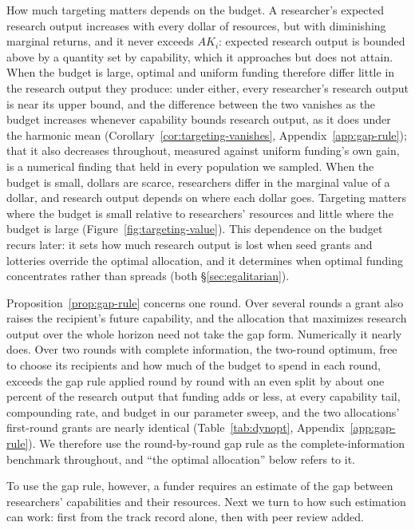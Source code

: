 \documentclass[article, 11pt, reqno]{amsart}
\theoremstyle{named}
\begin{document}
How much targeting matters depends on the budget. A researcher's expected research output increases with every dollar of resources, but with diminishing marginal returns, and it never exceeds $AK_i$: expected research output is bounded above by a quantity set by capability, which it approaches but does not attain. When the budget is large, optimal and uniform funding therefore differ little in the research output they produce: under either, every researcher's research output is near its upper bound, and the difference between the two vanishes as the budget increases whenever capability bounds research output, as it does under the harmonic mean (Corollary~\ref{cor:targeting-vanishes}, Appendix~\ref{app:gap-rule}); that it also decreases throughout, measured against uniform funding's own gain, is a numerical finding that held in every population we sampled. When the budget is small, dollars are scarce, researchers differ in the marginal value of a dollar, and research output depends on where each dollar goes. Targeting matters where the budget is small relative to researchers' resources and little where the budget is large (Figure~\ref{fig:targeting-value}). This dependence on the budget recurs later: it sets how much research output is lost when seed grants and lotteries override the optimal allocation, and it determines when optimal funding concentrates rather than spreads (both \S\ref{sec:egalitarian}).



Proposition~\ref{prop:gap-rule} concerns one round. Over several rounds a grant also raises the recipient's future capability, and the allocation that maximizes research output over the whole horizon need not take the gap form. Numerically it nearly does. Over two rounds with complete information, the two-round optimum, free to choose its recipients and how much of the budget to spend in each round, exceeds the gap rule applied round by round with an even split by about one percent of the research output that funding adds or less, at every capability tail, compounding rate, and budget in our parameter sweep, and the two allocations' first-round grants are nearly identical (Table~\ref{tab:dynopt}, Appendix~\ref{app:gap-rule}). We therefore use the round-by-round gap rule as the complete-information benchmark throughout, and ``the optimal allocation'' below refers to it.

To use the gap rule, however, a funder requires an estimate of the gap between researchers' capabilities and their resources. Next we turn to how such estimation can work: first from the track record alone, then with peer review added.
\end{document}
